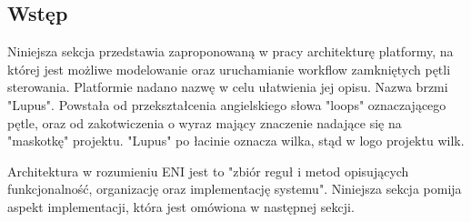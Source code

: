 \subsection{Wstęp}

Niniejsza sekcja przedstawia zaproponowaną w pracy architekturę  platformy, na której jest możliwe modelowanie oraz uruchamianie workflow zamkniętych pętli sterowania. Platformie nadano nazwę w celu ułatwienia jej opisu. Nazwa brzmi "Lupus". Powstała od przekształcenia angielskiego słowa "loops" oznaczającego pętle, oraz od zakotwiczenia o wyraz mający znaczenie nadające się na "maskotkę" projektu. "Lupus" po łacinie oznacza wilka, stąd w logo projektu wilk. 

Architektura w rozumieniu ENI jest to "zbiór reguł i metod opisujących funkcjonalność, organizację oraz implementację systemu". Niniejsza sekcja pomija aspekt implementacji, która jest omówiona w następnej sekcji. 

